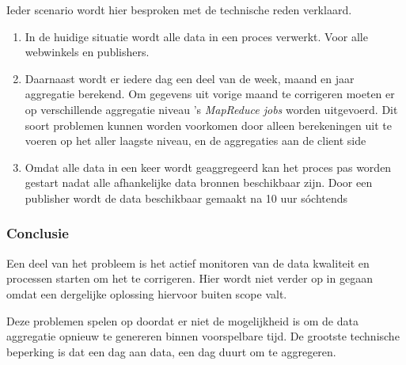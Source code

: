 Ieder scenario wordt hier besproken met de technische reden verklaard.

\begin{enumerate}
    \item In de huidige situatie wordt alle data in een proces verwerkt. Voor alle webwinkels en publishers. 
    
    \item Daarnaast wordt er iedere dag een deel van de week, maand en jaar aggregatie berekend. Om gegevens uit vorige maand te corrigeren moeten er op verschillende aggregatie niveau 's \textit{MapReduce jobs} worden uitgevoerd.
    Dit soort problemen kunnen worden voorkomen door alleen berekeningen uit te voeren op het aller laagste niveau, en de aggregaties aan de client side 
        
    \item Omdat alle data in een keer wordt geaggregeerd kan het proces pas worden gestart nadat alle afhankelijke data bronnen beschikbaar zijn. Door een publisher wordt de data beschikbaar gemaakt na 10 uur s\'ochtends
\end{enumerate}

\subsubsection{\textbf{Conclusie}}

Een deel van het probleem is het actief monitoren van de data kwaliteit en processen starten om het te corrigeren. Hier wordt niet verder op in gegaan omdat een dergelijke oplossing hiervoor buiten scope valt.

Deze problemen spelen op doordat er niet de mogelijkheid is om de data aggregatie opnieuw te genereren binnen voorspelbare tijd. De grootste technische beperking is dat een dag aan data, een dag duurt om te aggregeren.

